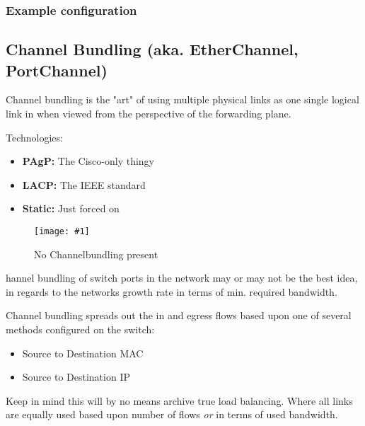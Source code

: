 \documentclass[a4paper,12pt,twoside,twocolumn]{book}
\newcommand{\fig}[4]{
\begin{figure}[h]
    \centering
    \texttt{[image: \#1]}
    \caption{#3}
    \label{fig:#2}
\end{figure}
}
\begin{document}
\subsubsection{Example configuration}


\subsection{Channel Bundling (aka. EtherChannel, PortChannel)}
Channel bundling is the "art" of using multiple physical links as one single logical link in when viewed from the perspective of the forwarding plane.

Technologies:
\begin{itemize}
    \item \textbf{PAgP:} The Cisco-only thingy
    \item \textbf{LACP:} The IEEE standard
    \item \textbf{Static:} Just forced on
\end{itemize}

\fig{channelbundling/network-without-channelbundling}{noethernetchannel}%
{No Channelbundling present}

Channel bundling of switch ports in the network may or may not be the best idea, in regards to the networks growth rate in terms of min. required bandwidth.

Channel bundling spreads out the in and egress flows based upon one of several methods configured on the switch:
\begin{itemize}
    \item Source to Destination MAC
    \item Source to Destination IP
\end{itemize}
Keep in mind this will by no means archive true load balancing. Where all links are equally used based upon number of flows \textit{or} in terms of used bandwidth.
\end{document}
